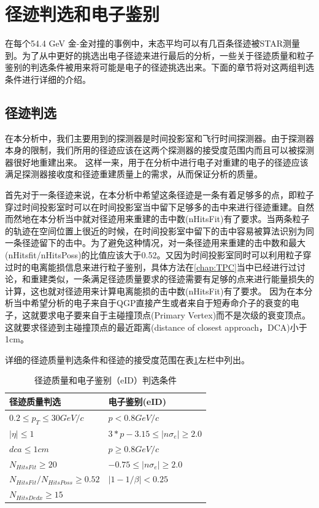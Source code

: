 \section{径迹判选和电子鉴别}
在每个54.4 GeV 金-金对撞的事例中，末态平均可以有几百条径迹被STAR测量到。为了从中更好的挑选出电子径迹来进行最后的分析，一些关于径迹质量和粒子鉴别的判选条件被用来将可能是电子的径迹挑选出来。下面的章节将对这两组判选条件进行详细的介绍。
\subsection{径迹判选}
在本分析中，我们主要用到的探测器是时间投影室和飞行时间探测器。由于探测器本身的限制，我们所用的径迹应该在这两个探测器的接受度范围内而且可以被探测器很好地重建出来。
这样一来，用于在分析中进行电子对重建的电子的径迹应该满足探测器接收度和径迹重建质量上的需求，从而保证分析的质量。

首先对于一条径迹来说，在本分析中希望这条径迹是一条有着足够多的点，即粒子穿过时间投影室时可以在时间投影室当中留下足够多的击中来进行径迹重建。自然而然地在本分析当中就对径迹用来重建的击中数(nHitsFit)有了要求。当两条粒子的轨迹在空间位置上很近的时候，在时间投影室中留下的击中容易被算法识别为同一条径迹留下的击中。为了避免这种情况，对一条径迹用来重建的击中数和最大(nHitsfit/nHitsPoss)的比值应该大于0.52。又因为时间投影室同时可以利用粒子穿过时的电离能损信息来进行粒子鉴别，具体方法在\ref{chap:TPC}当中已经进行过讨论，和重建类似，一条满足径迹质量要求的径迹需要有足够的点来进行能量损失的计算，这也就对径迹用来计算电离能损的击中数(nHitsFit)有了要求。
因为在本分析当中希望分析的电子来自于QGP直接产生或者来自于短寿命介子的衰变的电子，这就要求电子要来自于主碰撞顶点(Primary Vertex)而不是次级的衰变顶点。这就要求径迹到主碰撞顶点的最近距离(distance of closest approach，DCA)小于1cm。

详细的径迹质量判选条件和径迹的接受度范围在表\ref{tab:TrackQuality}左栏中列出。


\begin{table}[h!]
    \centering
    \caption{径迹质量和电子鉴别（eID）判选条件}
    \label{tab:TrackQuality}
    \begin{tabularx}{0.8\textwidth} {
    | >{\centering\arraybackslash}X |>{\centering\arraybackslash}X | }
        \hline
        径迹质量判选 & 电子鉴别(eID)   \\
        \hline
        $0.2 \leq p_{T} \leq 30 GeV/c $ & $p<0.8 GeV/c $ \\
        $|\eta| \leq 1 $ & $ 3*p - 3.15 \leq |n\sigma_{e}| \geq 2.0$  \\
        $dca \leq 1cm $ & $p \geq 0.8 GeV/c $\\ 
        $N_{HitsFit} \geq 20 $  & $ -0.75 \leq |n\sigma_{e}| \geq 2.0 $\\
        ${N_{HitsFit}}/{N_{HitsPoss}} \geq 0.52 $ &  $|1-1/\beta| < 0.25 $\\
        $N_{HitsDedx} \geq 15 $  & \\
        \hline
    \end{tabularx}
\end{table}

